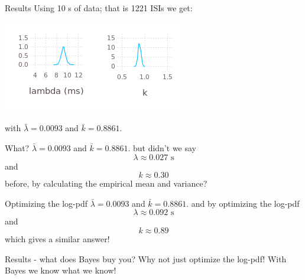 \documentclass{beamer}
\newcommand{\cbla}{\color{black}}
\newcommand{\cblu}{\color{blue}}
\begin{document}
\begin{frame}{Results}
  \vskip 1cm
  Using 10 s of data; that is 1221 ISIs we get:
  \vskip 1cm
  \begin{center}
    \includegraphics[width=4cm]{lambda10000.png}\qquad\includegraphics[width=4cm]{k10000.png}
  \end{center}
with \cblu$\bar{\lambda}=0.0093$\cbla{} and \cblu$\bar{k}=0.8861$\cbla.
\end{frame}


\begin{frame}{What?}
\vskip 1cm
\cblu$\bar{\lambda}=0.0093$\cbla{} and \cblu$\bar{k}=0.8861$\cbla.
\vskip 1cm
but didn't we say
\cblu
  $$\lambda\approx 0.027\text{ s}$$
  \cbla{}and \cblu
  $$k\approx 0.30$$
  \cbla
  before, by calculating the empirical mean and variance?
\end{frame}


\begin{frame}{Optimizing the log-pdf}
\vskip 1cm
\cblu$\bar{\lambda}=0.0093$\cbla{} and \cblu$\bar{k}=0.8861$\cbla.
\vskip 1cm
and by optimizing the log-pdf
\cblu
  $$\lambda\approx 0.092\text{ s}$$
  \cbla{}and \cblu
  $$k\approx 0.89$$
  \cbla
  which gives a similar answer!
\end{frame}


\begin{frame}{Results - what does Bayes buy you?}
  \vskip 1cm
  Why not just optimize the log-pdf!
  \vskip 1cm
  With Bayes we know what we know!
  \end{frame}
\end{document}
